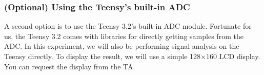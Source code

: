 \documentclass[letterpaper, 11pt]{article}
\begin{document}
%				
%			
%	

\subsubsection{(Optional) Using the Teensy's built-in ADC}
\label{sec:teensy-sa}

A second option is to use the Teensy 3.2's built-in ADC module. Fortunate for us, the Teensy 3.2 comes with libraries for directly getting samples from the ADC. In this experiment, we will also be performing signal analysis on the Teensy directly. To display the result, we will use a simple 128$\times$160 LCD display. You can request the display from the TA. 
\end{document}
